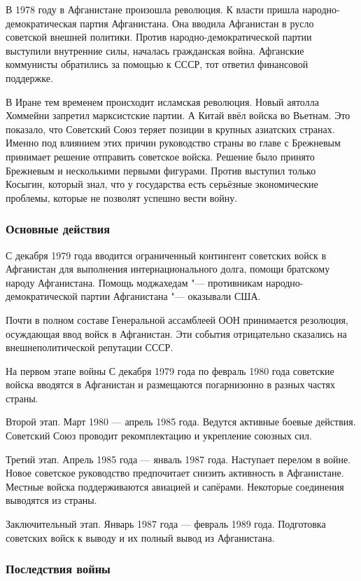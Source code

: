     В 1978 году в Афганистане произошла революция. К власти пришла народно-демократическая партия Афганистана. Она вводила Афганистан в русло советской внешней политики. Против народно-демократической партии выступили внутренние силы, началась гражданская война. Афганские коммунисты обратились за помощью к СССР, тот ответил финансовой поддержке.
    
    В Иране тем временем происходит исламская революция. Новый аятолла Хоммейни запретил марксистские партии. А Китай ввёл войска во Вьетнам. Это показало, что Советский Союз теряет позиции в крупных азиатских странах. Именно под влиянием этих причин руководство страны во главе с Брежневым принимает решение отправить советское войска. Решение было принято Брежневым и несколькими первыми фигурами. Против выступил только Косыгин, который знал, что у государства есть серьёзные экономические проблемы, которые не позволят успешно вести войну.

    \subsubsection{Основные действия}
    С декабря 1979 года вводится ограниченный контингент советских войск в Афганистан для выполнения интернационального долга, помощи братскому народу Афганистана. Помощь моджахедам "--- противникам народно-демократической партии Афганистана "--- оказывали США.
    
    Почти в полном составе Генеральной ассамблеей ООН принимается резолюция, осуждающая ввод войск в Афганистан. Эти события отрицательно сказались на внешнеполитической репутации СССР.
    
    На первом этапе войны С декабря 1979 года по февраль 1980 года советские войска вводятся в Афганистан и размещаются погарнизонно в разных частях страны.
    
    Второй этап. Март 1980 --- апрель 1985 года. Ведутся активные боевые действия. Советский Союз проводит рекомплектацию и укрепление союзных сил.
    
    Третий этап. Апрель 1985 года --- янваль 1987 года. Наступает перелом в войне. Новое советское руководство предпочитает снизить активность в Афганистане. Местные войска поддерживаются авиацией и сапёрами. Некоторые соединения выводятся из страны.
    
    Заключительный этап. Январь 1987 года --- февраль 1989 года. Подготовка советских войск к выводу и их полный вывод из Афганистана.

    \subsubsection{Последствия войны}
    

